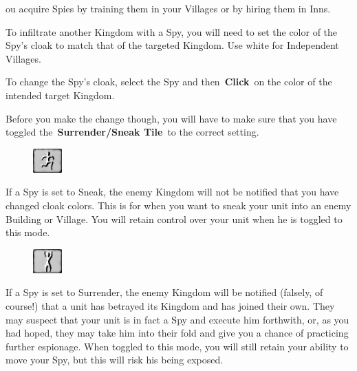 
ou acquire Spies by training them in your Villages or by hiring them in Inns.

To infiltrate another Kingdom with a Spy, you will need to set the color of the Spy’s cloak to match that of the targeted Kingdom. Use white for Independent Villages.

To change the Spy’s cloak, select the Spy and then \textbf{Click} on the color of the intended target Kingdom.

Before you make the change though, you will have to make sure that you have toggled the \textbf{Surrender/Sneak Tile} to the correct setting.

\clearpage

\begin{figure}
	\vspace{-20pt}
	\begin{center}
		\includegraphics[width=0.1\textwidth]{Tsneak}
	\end{center}
	\vspace{-10pt}
\end{figure}

If a Spy is set to Sneak, the enemy Kingdom will not be notified that you have changed cloak colors. This is for when you want to sneak your unit into an enemy Building or Village. You will retain control over your unit when he is toggled to this mode.

\begin{figure}
	\vspace{-20pt}
	\begin{center}
		\includegraphics[width=0.1\textwidth]{Treveal}
	\end{center}
	\vspace{-20pt}
\end{figure}

If a Spy is set to Surrender, the enemy Kingdom will be notified (falsely, of course!) that a unit has betrayed its Kingdom and has joined their own. They may suspect that your unit is in fact a Spy and execute him forthwith, or, as you had hoped, they may take him into their fold and give you a chance of practicing further espionage. When toggled to this mode, you will still retain your ability to move your Spy, but this will risk his being exposed.

